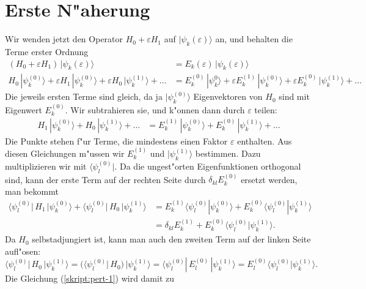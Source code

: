 \section{Erste N"aherung\label{section:erstenaeherung}}
Wir wenden jetzt den Operator $H_0+\varepsilon H_1$ auf
$|\psi_k(\varepsilon)\rangle$ an, und behalten die Terme erster Ordnung
\begin{align*}
(H_0+\varepsilon H_1)\,|\psi_k(\varepsilon)\rangle
&=
E_k(\varepsilon)\,|\psi_k(\varepsilon)\rangle
\\
H_0\,|\psi_k^{(0)}\rangle +\varepsilon H_1\,|\psi_k^{(0)}\rangle
+\varepsilon H_0\,|\psi_k^{(1)}\rangle
+\dots
&=
E_k^{(0)}\,|\psi_k^{0}\rangle + \varepsilon E_k^{(1)} \,|\psi_k^{(0)}\rangle
+ \varepsilon E_k^{(0)} \,|\psi_k^{(1)}\rangle + \dots
\end{align*}
Die jeweils ersten Terme sind gleich, da ja $|\psi_k^{(0)}\rangle$
Eigenvektoren von $H_0$ sind mit Eigenwert $E_k^{(0)}$. Wir subtrahieren sie,
und k"onnen dann durch $\varepsilon$ teilen:
\begin{align*}
H_1\,|\psi_k^{(0)}\rangle
+H_0\,|\psi_k^{(1)}\rangle
+ \dots
&=
E_k^{(1)}\,|\psi_k^{(0)}\rangle + E_k^{(0)} \,|\psi_k^{(1)}\rangle+\dots
\end{align*}
Die Punkte stehen f"ur Terme, die mindestens einen Faktor $\varepsilon$
enthalten.
Aus diesen Gleichungen m"ussen wir $E_k^{(1)}$ und $|\psi_k^{(1)}\rangle$
bestimmen. Dazu multiplizieren wir mit $\langle \psi_l^{(0)}|$.
Da die ungest"orten Eigenfunktionen orthogonal sind, kann der erste
Term auf der rechten Seite durch $\delta_{kl}E_k^{(0)}$ ersetzt werden,
man bekommt
\begin{equation}
\begin{aligned}
\langle \psi_l^{(0)}|\, H_1 \,|\psi_k^{(0)}\rangle
+
\langle \psi_l^{(0)}|\, H_0 \,|\psi_k^{(1)}\rangle
&=
E_k^{(1)}\langle\psi_l^{(0)}|\psi_k^{(0)}\rangle
+
E_k^{(0)}\langle\psi_l^{(0)}|\psi_k^{(1)}\rangle
\\
&=
\delta_{kl} E_k^{(1)}
+
E_k^{(0)}\langle\psi_l^{(0)}|\psi_k^{(1)}\rangle.
\end{aligned}
\label{skript:pert-1}
\end{equation}
Da $H_0$ selbstadjungiert ist, kann man auch den zweiten Term auf der
linken Seite aufl"osen:
\[
\langle\psi_l^{(0)}|\,H_0\,|\psi_k^{(1)}\rangle
=
(\langle\psi_l^{(0)}|\,H_0)\,|\psi_k^{(1)}\rangle
=
\langle\psi_l^{(0)}|\,E_l^{(0)}\,|\psi_k^{(1)}\rangle
=
E_l^{(0)}\langle \psi_l^{(0)}|\psi_k^{(1)}\rangle.
\]
Die Gleichung (\ref{skript:pert-1}) wird damit zu
